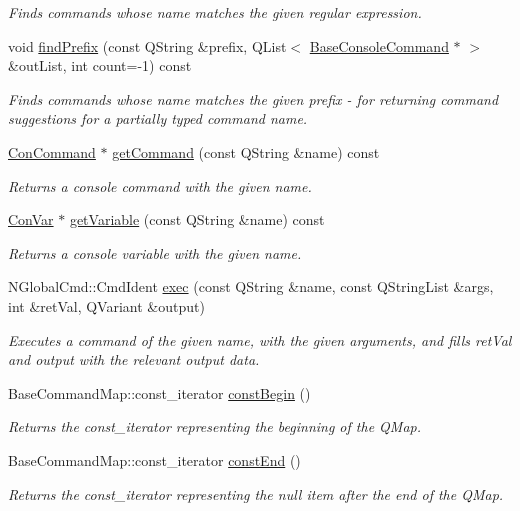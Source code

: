 \begin{DoxyCompactItemize}
\begin{DoxyCompactList}\small\item\em Finds commands whose name matches the given regular expression. \end{DoxyCompactList}\item 
void \hyperlink{class_command_manager_ac7c0a660ffb6a1e2e7d0879f58926116}{find\-Prefix} (const Q\-String \&prefix, Q\-List$<$ \hyperlink{class_base_console_command}{Base\-Console\-Command} $\ast$ $>$ \&out\-List, int count=-\/1) const 
\begin{DoxyCompactList}\small\item\em Finds commands whose name matches the given prefix -\/ for returning command suggestions for a partially typed command name. \end{DoxyCompactList}\item 
\hyperlink{class_con_command}{Con\-Command} $\ast$ \hyperlink{class_command_manager_a721e6e49dd5426cff526c567f1912ac8}{get\-Command} (const Q\-String \&name) const 
\begin{DoxyCompactList}\small\item\em Returns a console command with the given name. \end{DoxyCompactList}\item 
\hyperlink{class_con_var}{Con\-Var} $\ast$ \hyperlink{class_command_manager_a1a5e708d4344cec77bc669e72f406075}{get\-Variable} (const Q\-String \&name) const 
\begin{DoxyCompactList}\small\item\em Returns a console variable with the given name. \end{DoxyCompactList}\item 
N\-Global\-Cmd\-::\-Cmd\-Ident \hyperlink{class_command_manager_a80c1150d315f8c15654d86cc2fdbea9d}{exec} (const Q\-String \&name, const Q\-String\-List \&args, int \&ret\-Val, Q\-Variant \&output)
\begin{DoxyCompactList}\small\item\em Executes a command of the given name, with the given arguments, and fills ret\-Val and output with the relevant output data. \end{DoxyCompactList}\item 
Base\-Command\-Map\-::const\-\_\-iterator \hyperlink{class_command_manager_a3c24e4fe95d7e0d030fadda3737d9130}{const\-Begin} ()
\begin{DoxyCompactList}\small\item\em Returns the const\-\_\-iterator representing the beginning of the Q\-Map. \end{DoxyCompactList}\item 
Base\-Command\-Map\-::const\-\_\-iterator \hyperlink{class_command_manager_a96f8aae555bc651fc03c975b334eee82}{const\-End} ()
\begin{DoxyCompactList}\small\item\em Returns the const\-\_\-iterator representing the null item after the end of the Q\-Map. \end{DoxyCompactList}\end{DoxyCompactItemize}


